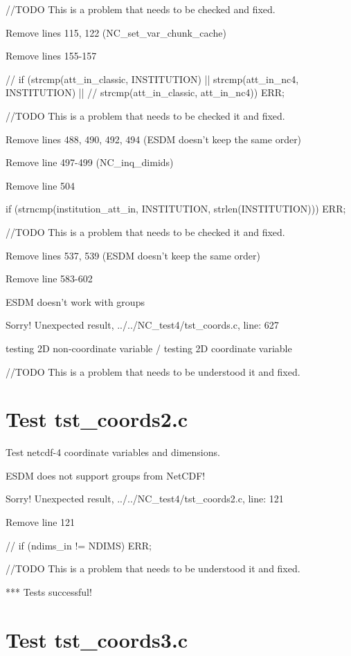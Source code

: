 //TODO This is a problem that needs to be checked and fixed.

Remove lines 115, 122 (NC\_set\_var\_chunk\_cache)

Remove lines 155-157

// if (strcmp(att\_in\_classic, INSTITUTION) || strcmp(att\_in\_nc4, INSTITUTION) ||
// strcmp(att\_in\_classic, att\_in\_nc4)) ERR;

//TODO This is a problem that needs to be checked it and fixed.

Remove lines 488, 490, 492, 494 (ESDM doesn't keep the same order)

Remove line 497-499 (NC\_inq\_dimids)

Remove line 504

if (strncmp(institution\_att\_in, INSTITUTION, strlen(INSTITUTION))) ERR;

//TODO This is a problem that needs to be checked it and fixed.

Remove lines 537, 539 (ESDM doesn't keep the same order)

Remove line 583-602

ESDM doesn't work with groups

Sorry! Unexpected result, ../../NC\_test4/tst\_coords.c, line: 627

testing 2D non-coordinate variable / testing 2D coordinate variable

//TODO This is a problem that needs to be understood it and fixed.

\section{Test tst\_coords2.c}

Test netcdf-4 coordinate variables and dimensions.

ESDM does not support groups from NetCDF!

Sorry! Unexpected result, ../../NC\_test4/tst\_coords2.c, line: 121

Remove line 121

// if (ndims\_in != NDIMS) ERR;

//TODO This is a problem that needs to be understood it and fixed.

*** Tests successful!

\section{Test tst\_coords3.c}

